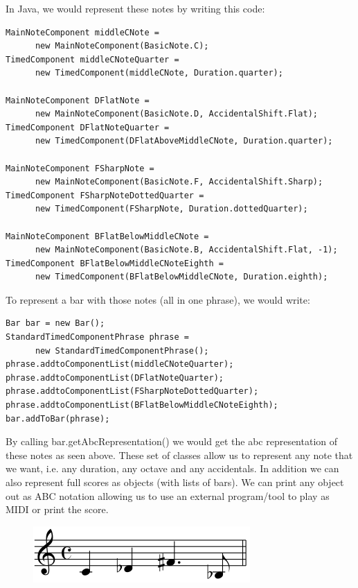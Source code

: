\documentclass[pdftex,12pt,a4paper]{report}
\begin{document}
In Java, we would represent these notes by writing this code:

\begin{lstlisting}
MainNoteComponent middleCNote = 
      new MainNoteComponent(BasicNote.C);
TimedComponent middleCNoteQuarter = 
      new TimedComponent(middleCNote, Duration.quarter);

MainNoteComponent DFlatNote = 
      new MainNoteComponent(BasicNote.D, AccidentalShift.Flat);
TimedComponent DFlatNoteQuarter = 
      new TimedComponent(DFlatAboveMiddleCNote, Duration.quarter);

MainNoteComponent FSharpNote = 
      new MainNoteComponent(BasicNote.F, AccidentalShift.Sharp);
TimedComponent FSharpNoteDottedQuarter = 
      new TimedComponent(FSharpNote, Duration.dottedQuarter);

MainNoteComponent BFlatBelowMiddleCNote = 
      new MainNoteComponent(BasicNote.B, AccidentalShift.Flat, -1);
TimedComponent BFlatBelowMiddleCNoteEighth = 
      new TimedComponent(BFlatBelowMiddleCNote, Duration.eighth);

\end{lstlisting}

To represent a bar with those notes (all in one phrase), we would write:

\begin{lstlisting}
Bar bar = new Bar();
StandardTimedComponentPhrase phrase = 
      new StandardTimedComponentPhrase();
phrase.addtoComponentList(middleCNoteQuarter);
phrase.addtoComponentList(DFlatNoteQuarter);
phrase.addtoComponentList(FSharpNoteDottedQuarter);
phrase.addtoComponentList(BFlatBelowMiddleCNoteEighth);
bar.addToBar(phrase);

\end{lstlisting}

By calling bar.getAbcRepresentation() we would get the abc representation of these notes as seen above.
These set of classes allow us to represent any note that we want, i.e. any duration, any octave and any accidentals. In addition we can also represent full scores as objects (with lists of bars). We can print any object out as ABC notation allowing us to use an external program/tool to play as MIDI or print the score.

\begin{figure}[here]
  \centering
  \includegraphics[scale=0.6]{figure/abcnotationexample.png}
  \label{fig:abcnotationexample}
\end{figure}
\end{document}
